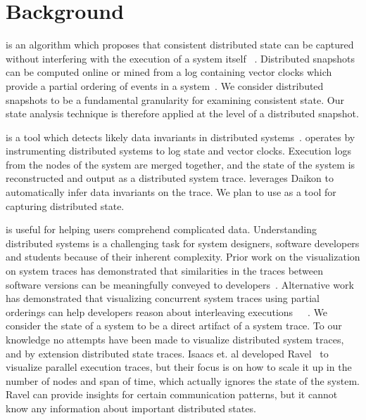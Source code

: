 \section{Background}
\label{sec:background}


 is an algorithm which
proposes that consistent distributed state can be captured without
interfering with the execution of a system itself
~\cite{dist_snapshots_Chandy1985}.  Distributed snapshots can be
computed online or mined from a log containing vector clocks which
provide a partial ordering of events in a
system~\cite{mattern_vector_clocks_1989}. We consider distributed
snapshots to be a fundamental granularity for examining consistent
state. Our state analysis technique is therefore applied at the level
of a distributed snapshot.

\noindent{\textbf{\dinv}} is a tool which detects likely data invariants in distributed
systems~\cite{dinv}. \dinv operates by instrumenting distributed
systems to log state and vector clocks. Execution logs from the nodes
of the system are merged together, and the state of the system is
reconstructed and output as a distributed system trace. \dinv
leverages Daikon to automatically infer data invariants on the trace.
We plan to use \dinv as a tool for capturing distributed state.

 is useful for helping users
comprehend complicated data.  Understanding distributed systems is a
challenging task for system designers, software developers and
students because of their inherent complexity.  Prior work on the
visualization on system traces has demonstrated that similarities in
the traces between software versions can be meaningfully conveyed to
developers~\cite{6613833}. Alternative work has demonstrated that
visualizing concurrent system traces using partial orderings can help
developers reason about interleaving
executions~\cite{6650534}~\cite{7272586}~\cite{isaacs2014combing}. 
We consider the state of a
system to be a direct artifact of a system trace. To our knowledge no
attempts have been made to visualize distributed system traces, and by
extension distributed state traces.  Isaacs et. al developed Ravel~\cite{isaacs2014combing}
to visualize parallel execution traces, but their focus is on how to 
scale it up in the number of nodes and span of time, which actually
ignores the state of the system.  Ravel can provide insights for 
certain communication patterns, but it cannot know any information
about important distributed states.

